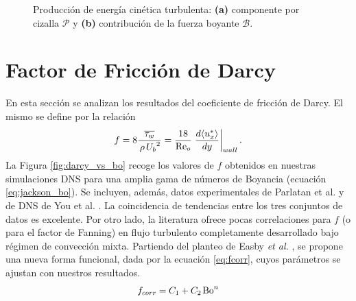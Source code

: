 \begin{figure}[H]
  \centering
  \caption{Producción de energía cinética turbulenta: \textbf{(a)} componente por cizalla $\mathcal{P}$ y \textbf{(b)} contribución de la fuerza boyante $\mathcal{B}$.}
  \label{fig:budgets_prod}
\end{figure}


\newpage
\section{Factor de Fricción de Darcy}

En esta sección se analizan los resultados del coeficiente de fricción de Darcy. El mismo se define por la relación
\begin{equation}
f = 8 \frac{ \overline{\tau_w}}{\hspace{0.5mm} \rho \hspace{0.5mm} {U_b}^2 }  = \frac{18}{\text{Re}_o} \left.\frac{d \langle u^*_x \rangle}{dy}\right\vert_{wall} \text{.}
\label{eq:darcy}
\end{equation}
La Figura \ref{fig:darcy_vs_bo} recoge los valores de $f$ obtenidos en nuestras simulaciones DNS para una amplia gama de números de Boyancia (ecuación \ref{eq:jackson_bo}). Se incluyen, además, datos experimentales de Parlatan et al. \cite{parlatan1996buoyancy} y de DNS de You et al. \cite{you2003direct}. La coincidencia de tendencias entre los tres conjuntos de datos es excelente. Por otro lado, la literatura ofrece pocas correlaciones para $f$ (o para el factor de Fanning) en flujo turbulento completamente desarrollado bajo régimen de convección mixta. Partiendo del planteo de Easby \textit{et al.} \cite{easby1978effect}, se propone una nueva forma funcional, dada por la ecuación \ref{eq:fcorr}, cuyos parámetros se ajustan con nuestros resultados.
\begin{equation}
f_{corr} = C_1 + C_2 \hspace*{0.5mm} \text{Bo}^n
\label{eq:fcorr}
\end{equation}

